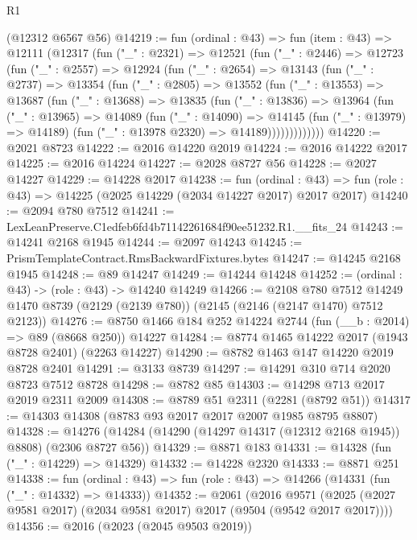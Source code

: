 \begin{lexlean}{R1}
\begin{coremodule}
    (@12312 @6567 @56)
@14219 := fun (ordinal : @43) =>
  fun (item : @43) =>
  @12111
    (@12317
      (fun ("_" : @2321) =>
      @12521
        (fun ("_" : @2446) =>
        @12723
          (fun ("_" : @2557) =>
          @12924
            (fun ("_" : @2654) =>
            @13143
              (fun ("_" : @2737) =>
              @13354
                (fun ("_" : @2805) =>
                @13552
                  (fun ("_" : @13553) =>
                  @13687
                    (fun ("_" : @13688) =>
                    @13835
                      (fun ("_" : @13836) =>
                      @13964
                        (fun ("_" : @13965) =>
                        @14089
                          (fun ("_" : @14090) =>
                          @14145
                            (fun ("_" : @13979) => @14189)
                            (fun ("_" : @13978 @2320) => @14189)))))))))))))
@14220 := @2021 @8723
@14222 := @2016 @14220 @2019
@14224 := @2016 @14222 @2017
@14225 := @2016 @14224
@14227 := @2028 @8727 @56
@14228 := @2027 @14227
@14229 := @14228 @2017
@14238 := fun (ordinal : @43) =>
  fun (role : @43) => @14225 (@2025 @14229 (@2034 @14227 @2017) @2017 @2017)
@14240 := @2094 @780 @7512
@14241 := LexLeanPreserve.C1edfeb6fd4b71142261684f90ee51232.R1.__fits_24
@14243 := @14241 @2168 @1945
@14244 := @2097 @14243
@14245 := PrismTemplateContract.RmsBackwardFixtures.bytes
@14247 := @14245 @2168 @1945
@14248 := @89 @14247
@14249 := @14244 @14248
@14252 := (ordinal : @43) -> (role : @43) -> @14240 @14249
@14266 := @2108
    @780
    @7512
    @14249
    @1470
    @8739
    (@2129 (@2139 @780))
    (@2145 (@2146 (@2147 @1470) @7512 @2123))
@14276 := @8750 @1466 @184 @252 @14224 @2744 (fun (__b : @2014) => @89 (@8668 @250)) @14227
@14284 := @8774 @1465 @14222 @2017 (@1943 @8728 @2401) (@2263 @14227)
@14290 := @8782 @1463 @147 @14220 @2019 @8728 @2401
@14291 := @3133 @8739
@14297 := @14291 @310 @714 @2020 @8723 @7512 @8728
@14298 := @8782 @85
@14303 := @14298 @713 @2017 @2019 @2311 @2009
@14308 := @8789 @51 @2311 (@2281 (@8792 @51))
@14317 := @14303 @14308 (@8783 @93 @2017 @2017 @2007 @1985 @8795 @8807)
@14328 := @14276 (@14284 (@14290 (@14297 @14317 (@12312 @2168 @1945)) @8808) (@2306 @8727 @56))
@14329 := @8871 @183
@14331 := @14328 (fun ("_" : @14229) => @14329)
@14332 := @14228 @2320
@14333 := @8871 @251
@14338 := fun (ordinal : @43) => fun (role : @43) => @14266 (@14331 (fun ("_" : @14332) => @14333))
@14352 := @2061
    (@2016 @9571 (@2025 (@2027 @9581 @2017) (@2034 @9581 @2017) @2017 (@9504 (@9542 @2017 @2017))))
@14356 := @2016 (@2023 (@2045 @9503 @2019))

\end{coremodule}
\end{lexlean}
